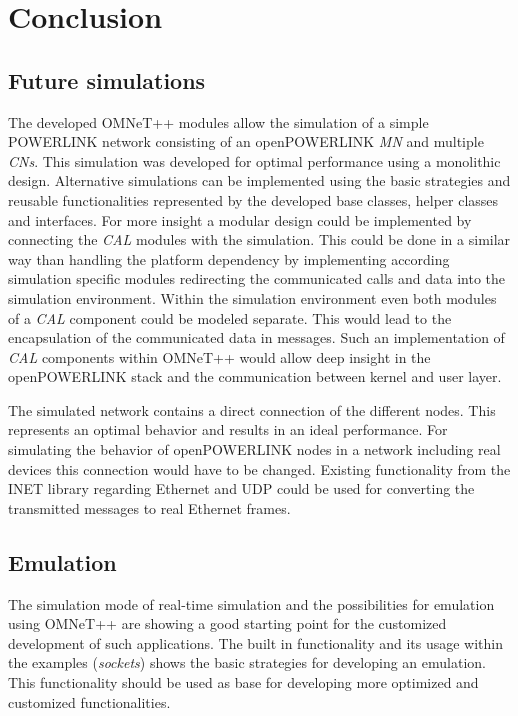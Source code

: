 \chapter{Conclusion}
\label{cha:conclusion}


\section{Future simulations}
\label{sec:conclusion_futuresim}
\begin{sloppypar}
The developed OMNeT++ modules allow the simulation of a simple \mbox{POWERLINK} network consisting of an openPOWERLINK \emph{MN} and multiple \emph{CNs}.
This simulation was developed for optimal performance using a monolithic design.
Alternative simulations can be implemented using the basic strategies and reusable functionalities represented by the developed base classes, helper classes and interfaces.
For more insight a modular design could be implemented by connecting the \emph{CAL} modules with the simulation.
This could be done in a similar way than handling the platform dependency by implementing according simulation specific modules redirecting the communicated calls and data into the simulation environment.
Within the simulation environment even both modules of a \emph{CAL} component could be modeled separate.
This would lead to the encapsulation of the communicated data in messages.
Such an implementation of \emph{CAL} components within OMNeT++ would allow deep insight in the openPOWERLINK stack and the communication between kernel and user layer.
\end{sloppypar}

The simulated network contains a direct connection of the different nodes.
This represents an optimal behavior and results in an ideal performance.
For simulating the behavior of openPOWERLINK nodes in a network including real devices this connection would have to be changed.
Existing functionality from the INET library regarding Ethernet and UDP could be used for converting the transmitted messages to real Ethernet frames.

\section{Emulation}
\label{sec:conclusion_emulation}
The simulation mode of real-time simulation and the possibilities for emulation using OMNeT++ are showing a good starting point for the customized development of such applications.
The built in functionality and its usage within the examples (\emph{sockets}) shows the basic strategies for developing an emulation.
This functionality should be used as base for developing more optimized and customized functionalities.


